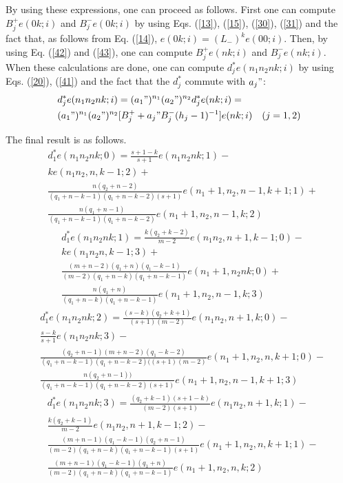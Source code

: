 \documentclass[a4paper,12pt]{article}%
\begin{document}
By using these expressions, one can proceed as follows. First one
can compute $B_j^+e(0k;i)$ and $B_j^-e(0k;i)$ by using Eqs.
(\ref{13}), (\ref{15}), (\ref{30}), (\ref{31}) and the fact that,
as follows from Eq. (\ref{14}), $e(0k;i)=(L_-)^ke(00;i)$.
Then, by using Eq. (\ref{42}) and (\ref{43}), one can compute 
$B_j^+e(nk;i)$ and $B_j^-e(nk;i)$. When these calculations 
are done, one can compute $d_j^*e(n_1n_2nk;i)$ by 
using Eqs. (\ref{20}), (\ref{41}) and
the fact that the $d_j^*$ commute with $a_j"$:
\begin{eqnarray} 
&d_j^*e(n_1n_2nk;i)=(a_1")^{n_1}(a_2")^{n_2}d_j^*e(nk;i)=\nonumber\\
&(a_1")^{n_1}(a_2")^{n_2}[B_j^++a_j"B_j^-(h_j-1)^{-1}]
e(nk;i)\quad (j=1,2)
\label{44}
\end{eqnarray}

The final result is as follows.
\begin{eqnarray}
&d_1^*e(n_1n_2nk;0)=\frac{s+1-k}{s+1}e(n_1n_2nk;1)-\nonumber\\
&ke(n_1n_2,n,k-1;2)+\nonumber\\
&\frac{n(q_2+n-2)}{(q_1+n-k-1)
(q_1+n-k-2)(s+1)}e(n_1+1,n_2,n-1,k+1;1)+\nonumber\\
&\frac{n(q_1+n-1)}{(q_1+n-k-1)(q_1+n-k-2)}e(n_1+1,n_2,n-1,k;2)
\label{45}
\end{eqnarray}
\begin{eqnarray}
&d_1^*e(n_1n_2nk;1)=\frac{k(q_2+k-2)}{m-2}
e(n_1n_2,n+1,k-1;0)-\nonumber\\
&ke(n_1n_2n,k-1;3)+\nonumber\\
&\frac{(m+n-2)(q_1+n)(q_1-k-1)}{(m-2)(q_1+n-k)(q_1+n-k-1)}
e(n_1+1,n_2nk;0)+\nonumber\\
&\frac{n(q_1+n)}{(q_1+n-k)(q_1+n-k-1)}e(n_1+1,n_2,n-1,k;3)
\label{46}
\end{eqnarray}
\begin{eqnarray}
&d_1^*e(n_1n_2nk;2)=\frac{(s-k)(q_2+k+1)}{(s+1)(m-2)}
e(n_1n_2,n+1,k;0)-\nonumber\\
&\frac{s-k}{s+1}e(n_1n_2nk;3)-\nonumber\\
&\frac{(q_2+n-1)(m+n-2)(q_1-k-2)}{(q_1+n-k-1)(q_1+n-k-2)((s+1)(m-2)}
e(n_1+1,n_2,n,k+1;0)-\nonumber\\
&\frac{n(q_2+n-1))}{(q_1+n-k-1)(q_1+n-k-2)(s+1)}e(n_1+1,n_2,n-1,k+1;3)
\label{47}
\end{eqnarray}
\begin{eqnarray}
&d_1^*e(n_1n_2nk;3)=\frac{(q_2+k-1)(s+1-k)}{(m-2)(s+1)}
e(n_1n_2,n+1,k;1)-\nonumber\\
&\frac{k(q_2+k-1)}{m-2}e(n_1n_2,n+1,k-1;2)-\nonumber\\
&\frac{(m+n-1)(q_1-k-1)(q_2+n-1)}{(m-2)(q_1+n-k)(q_1+n-k-1)(s+1)}
e(n_1+1,n_2,n,k+1;1)-\nonumber\\
&\frac{(m+n-1)(q_1-k-1)(q_1+n)}{(m-2)(q_1+n-k)(q_1+n-k-1)}
e(n_1+1,n_2,n,k;2)
\label{48}
\end{eqnarray}
\end{document}
